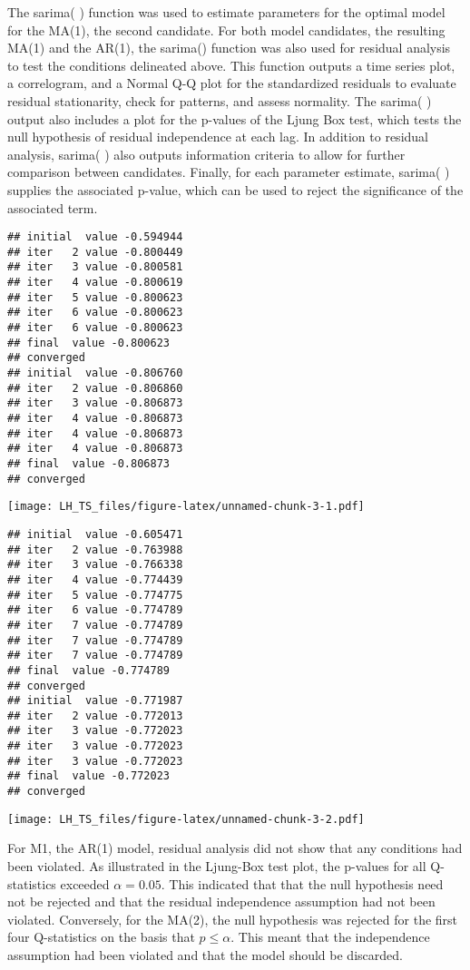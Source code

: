 \documentclass[]{article}
\begin{document}
The sarima( ) function was used to estimate parameters for the optimal
model for the MA(1), the second candidate. For both model candidates,
the resulting MA(1) and the AR(1), the sarima() function was also used
for residual analysis to test the conditions delineated above. This
function outputs a time series plot, a correlogram, and a Normal Q-Q
plot for the standardized residuals to evaluate residual stationarity,
check for patterns, and assess normality. The sarima( ) output also
includes a plot for the p-values of the Ljung Box test, which tests the
null hypothesis of residual independence at each lag. In addition to
residual analysis, sarima( ) also outputs information criteria to allow
for further comparison between candidates. Finally, for each parameter
estimate, sarima( ) supplies the associated p-value, which can be used
to reject the significance of the associated term.

\begin{verbatim}
## initial  value -0.594944 
## iter   2 value -0.800449
## iter   3 value -0.800581
## iter   4 value -0.800619
## iter   5 value -0.800623
## iter   6 value -0.800623
## iter   6 value -0.800623
## final  value -0.800623 
## converged
## initial  value -0.806760 
## iter   2 value -0.806860
## iter   3 value -0.806873
## iter   4 value -0.806873
## iter   4 value -0.806873
## iter   4 value -0.806873
## final  value -0.806873 
## converged
\end{verbatim}

\texttt{[image: LH\_TS\_files/figure-latex/unnamed-chunk-3-1.pdf]}

\begin{verbatim}
## initial  value -0.605471 
## iter   2 value -0.763988
## iter   3 value -0.766338
## iter   4 value -0.774439
## iter   5 value -0.774775
## iter   6 value -0.774789
## iter   7 value -0.774789
## iter   7 value -0.774789
## iter   7 value -0.774789
## final  value -0.774789 
## converged
## initial  value -0.771987 
## iter   2 value -0.772013
## iter   3 value -0.772023
## iter   3 value -0.772023
## iter   3 value -0.772023
## final  value -0.772023 
## converged
\end{verbatim}

\texttt{[image: LH\_TS\_files/figure-latex/unnamed-chunk-3-2.pdf]}

For M1, the AR(1) model, residual analysis did not show that any
conditions had been violated. As illustrated in the Ljung-Box test plot,
the p-values for all Q-statistics exceeded \(\alpha=0.05\). This
indicated that that the null hypothesis need not be rejected and that
the residual independence assumption had not been violated. Conversely,
for the MA(2), the null hypothesis was rejected for the first four
Q-statistics on the basis that \(p{\leq}{\alpha}\). This meant that the
independence assumption had been violated and that the model should be
discarded.
\end{document}
